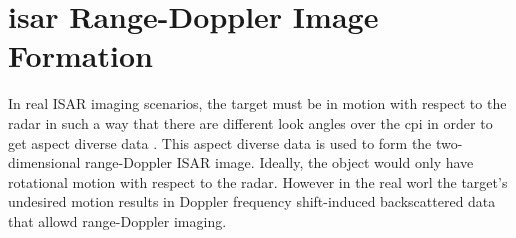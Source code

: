 \documentclass[class=report,11pt,crop=false]{standalone}
\begin{document}
\section{\gls{isar} Range-Doppler Image Formation \label{sec:theory_RD_image}} 

In real ISAR imaging scenarios, the target must be in motion with respect to the radar in such a way that there are different look angles over the \gls{cpi} in order to get aspect diverse data \cite{ISARtextbook_Matlab}. This aspect diverse data is used to form the two-dimensional range-Doppler ISAR image. Ideally, the object would only have rotational motion with respect to the radar. However in the real worl the target's undesired motion results in Doppler frequency shift-induced backscattered data that allowd range-Doppler imaging. 
\end{document}
